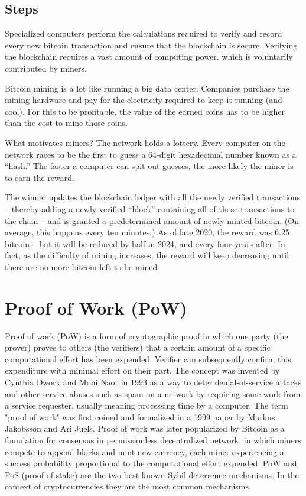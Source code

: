 \documentclass[BTech]{srmuthesis}
\begin{document}
 \subsection{Steps}
 Specialized computers perform the calculations required to verify and record every new bitcoin transaction and ensure that the blockchain is secure. Verifying the blockchain requires a vast amount of computing power, which is voluntarily contributed by miners. 

 Bitcoin mining is a lot like running a big data center. Companies purchase the mining hardware and pay for the electricity required to keep it running (and cool). For this to be profitable, the value of the earned coins has to be higher than the cost to mine those coins.

 What motivates miners? The network holds a lottery. Every computer on the network races to be the first to guess a 64-digit hexadecimal number known as a “hash.” The faster a computer can spit out guesses, the more likely the miner is to earn the reward. 

 The winner updates the blockchain ledger with all the newly verified transactions – thereby adding a newly verified “block” containing all of those transactions to the chain – and is granted a predetermined amount of newly minted bitcoin. (On average, this happens every ten minutes.) As of late 2020, the reward was 6.25 bitcoin – but it will be reduced by half in 2024, and every four years after. In fact, as the difficulty of mining increases, the reward will keep decreasing until there are no more bitcoin left to be mined.
 \section{Proof of Work (PoW)}
 Proof of work (PoW) is a form of cryptographic proof in which one party (the prover) proves to others (the verifiers) that a certain amount of a specific computational effort has been expended. Verifier can subsequently confirm this expenditure with minimal effort on their part. The concept was invented by Cynthia Dwork and Moni Naor in 1993 as a way to deter denial-of-service attacks and other service abuses such as spam on a network by requiring some work from a service requester, usually meaning processing time by a computer. The term "proof of work" was first coined and formalized in a 1999 paper by Markus Jakobsson and Ari Juels. Proof of work was later popularized by Bitcoin as a foundation for consensus in permissionless decentralized network, in which miners compete to append blocks and mint new currency, each miner experiencing a success probability proportional to the computational effort expended. PoW and PoS (proof of stake) are the two best known Sybil deterrence mechanisms. In the context of cryptocurrencies they are the most common mechanisms. \citet{crybloc}
 
\end{document}
